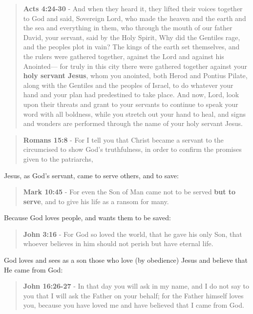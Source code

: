 \documentclass[11pt]{article}
\begin{document}
\begin{quote}
\textbf{Acts 4:24-30} - And when they heard it, they lifted their voices together to God and said, Sovereign Lord, who made the heaven and the earth and the sea and everything in them, who through the mouth of our father David, your servant, said by the Holy Spirit, Why did the Gentiles rage, and the peoples plot in vain?  The kings of the earth set themselves, and the rulers were gathered together, against the Lord and against his Anointed— for truly in this city there were gathered together against your \textbf{holy servant Jesus}, whom you anointed, both Herod and Pontius Pilate, along with the Gentiles and the peoples of Israel, to do whatever your hand and your plan had predestined to take place.  And now, Lord, look upon their threats and grant to your servants to continue to speak your word with all boldness, while you stretch out your hand to heal, and signs and wonders are performed through the name of your holy servant Jesus.
\end{quote}

\begin{quote}
\textbf{Romans 15:8} - For I tell you that Christ became a servant to the circumcised to show God's truthfulness, in order to confirm the promises given to the patriarchs,
\end{quote}

Jesus, as God's servant, came to serve others, and to save:

\begin{quote}
\textbf{Mark 10:45} - For even the Son of Man came not to be served \textbf{but to serve}, and to give his life as a ransom for many.
\end{quote}

Because God loves people, and wants them to be saved:

\begin{quote}
\textbf{John 3:16} - For God so loved the world, that he gave his only Son, that whoever believes in him should not perish but have eternal life.
\end{quote}

God loves and sees as a son those who love (by obedience) Jesus and believe that He came from God:

\begin{quote}
\textbf{John 16:26-27} - In that day you will ask in my name, and I do not say to you that I will ask the Father on your behalf; for the Father himself loves you, because you have loved me and have believed that I came from God.
\end{quote}
\end{document}
